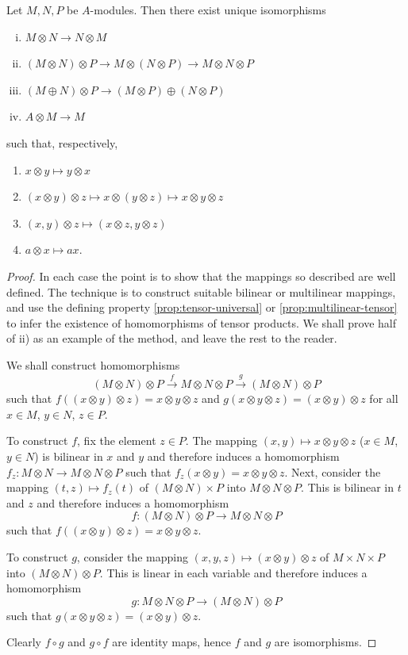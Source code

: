 \begin{proposition}\label{pro:canonical-isomorphisms}
Let $M, N, P$ be $A$-modules. Then there exist unique isomorphisms
\begin{enumerate}[i)]
    \item $M \otimes N \to N \otimes M$
    \item $(M \otimes N) \otimes P \to M \otimes (N \otimes P) \to M \otimes N \otimes P$
    \item $(M \oplus N) \otimes P \to (M \otimes P) \oplus (N \otimes P)$
    \item $A \otimes M \to M$
\end{enumerate}
such that, respectively,
\begin{enumerate}
    \item[a)] $x \otimes y \mapsto y \otimes x$
    \item[b)] $(x \otimes y) \otimes z \mapsto x \otimes (y \otimes z) \mapsto x \otimes y \otimes z$
    \item[c)] $(x, y) \otimes z \mapsto (x \otimes z, y \otimes z)$
    \item[d)] $a \otimes x \mapsto ax$.
\end{enumerate}
\end{proposition}

\begin{proof}
In each case the point is to show that the mappings so described are well defined. The technique is to construct suitable bilinear or multilinear mappings, and use the defining property \eqref{prop:tensor-universal} or \eqref{prop:multilinear-tensor} to infer the existence of homomorphisms of tensor products. We shall prove half of ii) as an example of the method, and leave the rest to the reader.

We shall construct homomorphisms
\[
(M \otimes N) \otimes P \stackrel{f}{\longrightarrow} M \otimes N \otimes P \stackrel{g}{\longrightarrow} (M \otimes N) \otimes P
\]
such that $f((x \otimes y) \otimes z) = x \otimes y \otimes z$ and $g(x \otimes y \otimes z) = (x \otimes y) \otimes z$ for all $x \in M$, $y \in N$, $z \in P$.

To construct $f$, fix the element $z \in P$. The mapping $(x, y) \mapsto x \otimes y \otimes z$ ($x \in M$, $y \in N$) is bilinear in $x$ and $y$ and therefore induces a homomorphism $f_z: M \otimes N \to M \otimes N \otimes P$ such that $f_z(x \otimes y) = x \otimes y \otimes z$. Next, consider the mapping $(t, z) \mapsto f_z(t)$ of $(M \otimes N) \times P$ into $M \otimes N \otimes P$. This is bilinear in $t$ and $z$ and therefore induces a homomorphism
\[
f: (M \otimes N) \otimes P \to M \otimes N \otimes P
\]
such that $f((x \otimes y) \otimes z) = x \otimes y \otimes z$.

To construct $g$, consider the mapping $(x, y, z) \mapsto (x \otimes y) \otimes z$ of $M \times N \times P$ into $(M \otimes N) \otimes P$. This is linear in each variable and therefore induces a homomorphism
\[
g: M \otimes N \otimes P \to (M \otimes N) \otimes P
\]
such that $g(x \otimes y \otimes z) = (x \otimes y) \otimes z$.

Clearly $f \circ g$ and $g \circ f$ are identity maps, hence $f$ and $g$ are isomorphisms. 
\end{proof}

